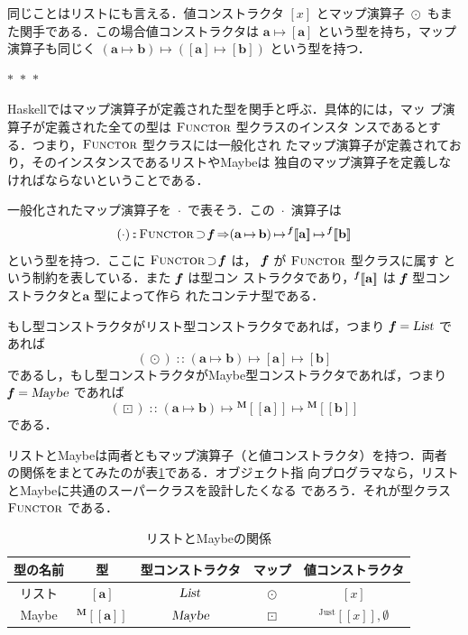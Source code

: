 \documentclass[a5paper,twoside,fleqn,draft]{jsbook}
\def\[{[\![}
\def\]{]\!]}
\newcommand{\separator}{\begin{center}$*$~$*$~$*$\end{center}}
\newcommand{\programminglanguage}[1]{\textsf{#1}}
\newcommand{\haskell}{\programminglanguage{Haskell}}
\DeclareMathOperator{\mSuperClass}{\Rightarrow}
\DeclareMathOperator{\mSuperSet}{\supset}
\newcommand{\mNothing}{\emptyset}
\DeclareMathOperator{\mFuncArrow}{\mapsto}
\DeclareMathOperator{\mIn}{{:\!:}}
\DeclareMathOperator{\mMap}{\cdot}
\DeclareMathOperator{\mMapList}{\odot}
\DeclareMathOperator{\mMapMaybe}{\boxdot}
\newcommand{\mType}[1]{\mathbf{#1}} %
\newcommand{\mPolymorphicTypeParameter}[1]{\textbf{\textit{#1}}}
\newcommand{\mA}{\mType{a}}
\newcommand{\mB}{\mType{b}}
\newcommand{\mTypeAssemble}[2]{{}^\mType{#1}\[\mType{#2}\]}
\newcommand{\mPolymorphicTypeAssemble}[2]{{}^\mPolymorphicTypeParameter{#1}\[\mType{#2}\]}
\newcommand{\mMaybeType}[1]{\mTypeAssemble{M}{#1}}
\newcommand{\mTypeConstructor}[1]{\textsl{#1}}
\DeclareMathOperator{\mListTypeConstructor}{\mTypeConstructor{List}}
\DeclareMathOperator{\mMaybeTypeConstructor}{\mTypeConstructor{Maybe}}
\newcommand{\mValueConstructor}[1]{\mathrm{#1}}
\newcommand{\mValueWith}[2]{{}^\mValueConstructor{#1}\[#2\]}
\newcommand{\mJustWith}[1]{\mValueWith{Just}{#1}}
\newcommand{\mTypeClass}[1]{\textsc{#1}} %
\newcommand{\mFunctorTypeClass}{\mTypeClass{Functor}}
\begin{document}
同じことはリストにも言える．値コンストラクタ $[x]$ とマップ演算子
$\mMapList$ もまた関手である．この場合値コンストラクタは
$\mA\mFuncArrow[\mA]$ という型を持ち，マップ演算子も同じく
$(\mA\mFuncArrow\mB)\mFuncArrow([\mA]\mFuncArrow[\mB])$ という型を持つ．

\separator

\haskell ではマップ演算子が定義された型を関手と呼ぶ．具体的には，マッ
プ演算子が定義された全ての型は $\mFunctorTypeClass$ 型クラスのインスタ
ンスであるとする．つまり，$\mFunctorTypeClass$ 型クラスには一般化され
たマップ演算子が定義されており，そのインスタンスであるリストやMaybeは
独自のマップ演算子を定義しなければならないということである．

一般化されたマップ演算子を $\mMap$ で表そう．この $\mMap$ 演算子は
\begin{equation}
  (\mMap)
  \mIn{}\mFunctorTypeClass
  \mSuperSet\mPolymorphicTypeParameter{f}
  \mSuperClass(\mA\mFuncArrow\mB)
  \mFuncArrow\mPolymorphicTypeAssemble{f}{a}
  \mFuncArrow\mPolymorphicTypeAssemble{f}{b}
\end{equation}
という型を持つ．ここに
$\mFunctorTypeClass\mSuperSet\mPolymorphicTypeParameter{f}$ は，
$\mPolymorphicTypeParameter{f}$ が $\mFunctorTypeClass$ 型クラスに属す
という制約を表している．また $\mPolymorphicTypeParameter{f}$ は型コン
ストラクタであり，$\mPolymorphicTypeAssemble{f}{a}$ は
$\mPolymorphicTypeParameter{f}$ 型コンストラクタと$\mA$ 型によって作ら
れたコンテナ型である．

もし型コンストラクタがリスト型コンストラクタであれば，つまり
$\mPolymorphicTypeParameter{f}=\mListTypeConstructor$ であれば
\begin{equation}
  (\mMapList)
  \mIn{}(\mA\mFuncArrow\mB)\mFuncArrow[\mA]\mFuncArrow[\mB]
\end{equation}
であるし，もし型コンストラクタがMaybe型コンストラクタであれば，つまり
$\mPolymorphicTypeParameter{f}=\mMaybeTypeConstructor$ であれば
\begin{equation}
  (\mMapMaybe)
  \mIn{}(\mA\mFuncArrow\mB)\mFuncArrow\mMaybeType{a}\mFuncArrow\mMaybeType{b}
\end{equation}
である．

リストとMaybeは両者ともマップ演算子（と値コンストラクタ）を持つ．両者
の関係をまとてみたのが表\ref{tab:list-and-maybe}である．オブジェクト指
向プログラマなら，リストとMaybeに共通のスーパークラスを設計したくなる
であろう．それが型クラス $\mFunctorTypeClass$ である．

\begin{table}
\label{tab:list-and-maybe}
\caption{リストとMaybeの関係}
\begin{center}
\begin{tabular}{||c|c|c|c|c||}\hline
型の名前&型&型コンストラクタ&マップ&値コンストラクタ\\\hline\hline
リスト&$[\mA]$&$\mListTypeConstructor$&$\mMapList$&$[x]$\\
Maybe&$\mMaybeType{a}$&$\mMaybeTypeConstructor$&$\mMapMaybe$&$\mJustWith{x},\mNothing$\\\hline
\end{tabular}
\end{center}
\end{table}
\end{document}
